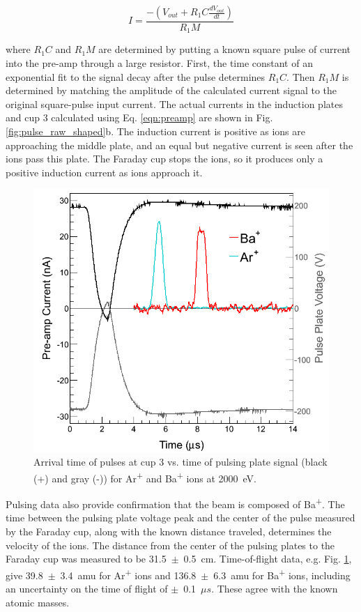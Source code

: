 \begin{equation}
I = \frac{-(V_{out} + R_{1} C \frac{dV_{out}}{dt})}{R_{1} M}
\label{eqn:preamp}
\end{equation}

\noindent
where $R_{1} C$ and $R_{1} M$ are determined by putting a known square pulse of current into the pre-amp through a large resistor.  First, the time constant of an exponential fit to the signal decay after the pulse determines $R_{1} C$.  Then $R_{1} M$ is determined by matching the amplitude of the calculated current signal to the original square-pulse input current.  The actual currents in the induction plates and cup 3 calculated using Eq. \ref{eqn:preamp} are shown in Fig. \ref{fig:pulse_raw_shaped}b.  The induction current is positive as ions are approaching the middle plate, and an equal but negative current is seen after the ions pass this plate.  The Faraday cup stops the ions, so it produces only a positive induction current as ions approach it.

\begin{figure} [h]
        \centering
                \includegraphics[width=.7\textwidth]{figures/pulses_BaAr.png}
                \caption{Arrival time of pulses at cup 3 vs. time of pulsing plate signal (black (+) and gray (-)) for Ar\textsuperscript{+} and Ba\textsuperscript{+} ions at 2000~eV.}
\label{fig:pulses_ArBa}
\end{figure}

Pulsing data also provide confirmation that the beam is composed of Ba\textsuperscript{+}.  The time between the pulsing plate voltage peak and the center of the pulse measured by the Faraday cup, along with the known distance traveled, determines the velocity of the ions.  The distance from the center of the pulsing plates to the Faraday cup was measured to be 31.5~$\pm$~0.5~cm.  Time-of-flight data, e.g. Fig. \ref{fig:pulses_ArBa}, give 39.8~$\pm$~3.4~amu for Ar\textsuperscript{+} ions and 136.8~$\pm$~6.3~amu for Ba\textsuperscript{+} ions, including an uncertainty on the time of flight of $\pm$~0.1~$\mu s$.  These agree with the known atomic masses.

